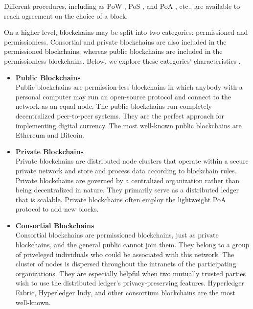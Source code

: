  \vspace{.5cm}
 
Different procedures, including as \ac{PoW} \cite{pow}, \ac{PoS} \cite{pos}, and \ac{PoA} \cite{poa}, etc., are available to reach agreement on the choice of a block.
 
\vspace{.5cm}
 
On a higher level, blockchains may be split into two categories: permissioned and permissionless. Consortial and private blockchains are also included in the permissioned blockchains, whereas public blockchains are included in the permissionless blockchains. Below, we explore these categories' characteristics \cite{typebc1, typebc2}.

\begin{itemize}
   

 \item \textbf{Public Blockchains} \\
Public blockchains are permission-less blockchains in which anybody with a personal computer may run an open-source protocol and connect to the network as an equal node. The public blockchains run completely decentralized peer-to-peer systems. They are the perfect approach for implementing digital currency. The most well-known public blockchains are Ethereum and Bitcoin.

\vspace{.5cm}

\item \textbf{Private Blockchains} \\
Private blockchains are distributed node clusters that operate within a secure private network and store and process data according to blockchain rules. Private blockchains are governed by a centralized organization rather than being decentralized in nature. They primarily serve as a distributed ledger that is scalable. Private blockchains often employ the lightweight \ac{PoA} protocol to add new blocks.

\vspace{.5cm}

 \item \textbf{Consortial Blockchains}\\
Consortial blockchains are permissioned blockchains, just as private blockchains, and the general public cannot join them. They belong to a group of priveleged individuals who could be associated with this network. The cluster of nodes is dispersed throughout the intranets of the participating organizations. They are especially helpful when two mutually trusted parties wish to use the distributed ledger's privacy-preserving features. Hyperledger Fabric, Hyperledger Indy, and other consortium blockchains are the most well-known.
\end{itemize}

